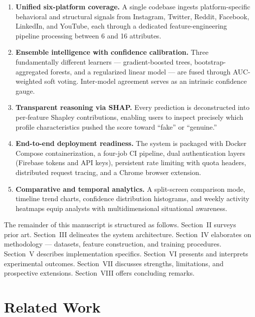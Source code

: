 \documentclass[conference]{IEEEtran}
\begin{document}
\begin{enumerate}
    \item \textbf{Unified six-platform coverage.} A single codebase ingests platform-specific behavioral and structural signals from Instagram, Twitter, Reddit, Facebook, LinkedIn, and YouTube, each through a dedicated feature-engineering pipeline processing between 6 and 16 attributes.
    \item \textbf{Ensemble intelligence with confidence calibration.} Three fundamentally different learners --- gradient-boosted trees, bootstrap-aggregated forests, and a regularized linear model --- are fused through AUC-weighted soft voting. Inter-model agreement serves as an intrinsic confidence gauge.
    \item \textbf{Transparent reasoning via SHAP.} Every prediction is deconstructed into per-feature Shapley contributions, enabling users to inspect precisely which profile characteristics pushed the score toward ``fake'' or ``genuine.''
    \item \textbf{End-to-end deployment readiness.} The system is packaged with Docker Compose containerization, a four-job CI pipeline, dual authentication layers (Firebase tokens and API keys), persistent rate limiting with quota headers, distributed request tracing, and a Chrome browser extension.
    \item \textbf{Comparative and temporal analytics.} A split-screen comparison mode, timeline trend charts, confidence distribution histograms, and weekly activity heatmaps equip analysts with multidimensional situational awareness.
\end{enumerate}

The remainder of this manuscript is structured as follows. Section~II surveys prior art. Section~III delineates the system architecture. Section~IV elaborates on methodology --- datasets, feature construction, and training procedures. Section~V describes implementation specifics. Section~VI presents and interprets experimental outcomes. Section~VII discusses strengths, limitations, and prospective extensions. Section~VIII offers concluding remarks.

\section{Related Work}
\end{document}
